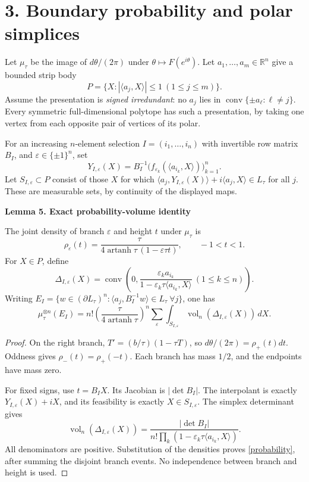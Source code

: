 \documentclass[11pt,a4paper]{article}
\newenvironment{statement}[1]{\begin{tcolorbox}[proofbox]\textbf{#1}\par\smallskip}{\end{tcolorbox}}
\newcommand{\R}{\mathbb R}
\newcommand{\vol}{\operatorname{vol}_n}
\newcommand{\conv}{\operatorname{conv}}
\newcommand{\artanh}{\operatorname{artanh}}
\newcommand{\pair}[2]{\langle #1,#2\rangle}
\newcommand{\sect}[1]{\section*{#1}}
\begin{document}
\newpage
\sect{3. Boundary probability and polar simplices}
Let $\mu_\tau$ be the image of $d\theta/(2\pi)$ under
$\theta\mapsto F(e^{i\theta})$. Let $a_1,\ldots,a_m\in\R^n$ give a
bounded strip body
\[
 P=\{X:|\pair{a_j}X|\leq1\ (1\leq j\leq m)\}.
\]
Assume the presentation is \emph{signed irredundant}: no $a_j$ lies in
$\conv\{\pm a_\ell:\ell\ne j\}$. Every symmetric full-dimensional
polytope has such a presentation, by taking one vertex from each opposite
pair of vertices of its polar.

For an increasing $n$-element selection $I=(i_1,\ldots,i_n)$ with
invertible row matrix $B_I$, and $\varepsilon\in\{\pm1\}^n$, set
\[
 Y_{I,\varepsilon}(X)=B_I^{-1}
       \big(f_{\varepsilon_k}(\pair{a_{i_k}}X)\big)_{k=1}^n.
\]
Let $S_{I,\varepsilon}\subset P$ consist of those $X$ for which
$\pair{a_j}{Y_{I,\varepsilon}(X)}+i\pair{a_j}X\in L_\tau$ for all $j$.
These are measurable sets, by continuity of the displayed maps.

\begin{statement}{Lemma 5. Exact probability-volume identity}
The joint density of branch $\varepsilon$ and height $t$ under $\mu_\tau$ is
\[
 \rho_\varepsilon(t)=
 \frac{\tau}{4\artanh\tau\,(1-\varepsilon\tau t)},\qquad -1<t<1.
\]
For $X\in P$, define
\[
 \Delta_{I,\varepsilon}(X)=\conv\left(0,
 \frac{\varepsilon_k a_{i_k}}{1-\varepsilon_k\tau\pair{a_{i_k}}X}
 \ (1\leq k\leq n)\right).
\]
Writing $E_I=\{w\in(\partial L_\tau)^n:
\pair{a_j}{B_I^{-1}w}\in L_\tau\ \forall j\}$, one has
\begin{equation}\label{probability}
 \mu_\tau^{\otimes n}(E_I)=
 n!\left(\frac{\tau}{4\artanh\tau}\right)^n
 \sum_{\varepsilon}\int_{S_{I,\varepsilon}}
                  \vol(\Delta_{I,\varepsilon}(X))\,dX.
\end{equation}
\end{statement}
\begin{proof}
On the right branch, $T'=(b/\tau)(1-\tau T)$, so
$d\theta/(2\pi)=\rho_+(t)dt$. Oddness gives
$\rho_-(t)=\rho_+(-t)$. Each branch has mass $1/2$, and the endpoints
have mass zero.

For fixed signs, use $t=B_IX$. Its Jacobian is $|\det B_I|$. The
interpolant is exactly $Y_{I,\varepsilon}(X)+iX$, and its feasibility
is exactly $X\in S_{I,\varepsilon}$. The simplex determinant gives
\[
 \vol(\Delta_{I,\varepsilon}(X))=
 \frac{|\det B_I|}{n!\prod_k(1-\varepsilon_k\tau\pair{a_{i_k}}X)}.
\]
All denominators are positive. Substitution of the densities proves
\eqref{probability}, after summing the disjoint branch events. No
independence between branch and height is used.
\end{proof}
\end{document}
